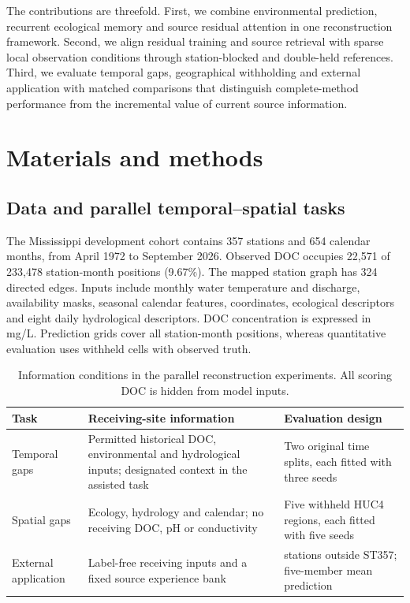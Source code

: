 \documentclass[11pt]{article}
\begin{document}
The contributions are threefold. First, we combine environmental prediction, recurrent ecological memory and source residual attention in one reconstruction framework. Second, we align residual training and source retrieval with sparse local observation conditions through station-blocked and double-held references. Third, we evaluate temporal gaps, geographical withholding and external application with matched comparisons that distinguish complete-method performance from the incremental value of current source information.

\section{Materials and methods}
\subsection{Data and parallel temporal--spatial tasks}
The Mississippi development cohort contains 357 stations and 654 calendar months, from April 1972 to September 2026. Observed DOC occupies 22,571 of 233,478 station-month positions (9.67\%). The mapped station graph has 324 directed edges. Inputs include monthly water temperature and discharge, availability masks, seasonal calendar features, coordinates, ecological descriptors and eight daily hydrological descriptors. DOC concentration is expressed in mg/L. Prediction grids cover all station-month positions, whereas quantitative evaluation uses withheld cells with observed truth.

\begin{table}[!htbp]\centering\small
\caption{Information conditions in the parallel reconstruction experiments. All scoring DOC is hidden from model inputs.}
\label{tab:tasks}
\setlength{\tabcolsep}{5pt}
\begin{tabular}{>{\raggedright\arraybackslash}p{3.0cm}>{\raggedright\arraybackslash}p{5.0cm}>{\raggedright\arraybackslash}p{5.9cm}}\toprule
Task & Receiving-site information & Evaluation design\\\midrule
Temporal gaps & Permitted historical DOC, environmental and hydrological inputs; designated context in the assisted task & Two original time splits, each fitted with three seeds\\
Spatial gaps & Ecology, hydrology and calendar; no receiving DOC, pH or conductivity & Five withheld HUC4 regions, each fitted with five seeds\\
External application & Label-free receiving inputs and a fixed source experience bank & 130 stations outside ST357; five-member mean prediction\\\bottomrule
\end{tabular}
\end{table}
\end{document}
